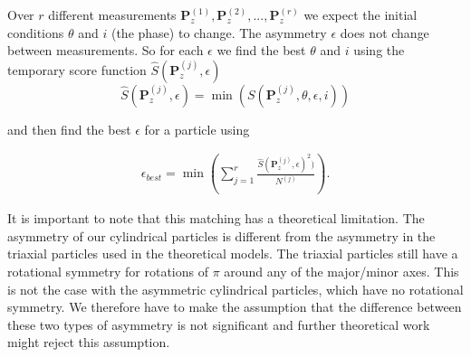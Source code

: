 \noindent Over $r$ different measurements $\mathbf{P}_z^{(1)}, \mathbf{P}_z^{(2)}, ..., \mathbf{P}_z^{(r)}$ we expect  the initial conditions $\theta$ and $i$ (the phase) to change. The asymmetry $\epsilon$ does not change between measurements. So for each $\epsilon$ we find the best $\theta$ and $i$ using the temporary score function $\hat{S}(\mathbf{P}^{(j)}_z, \epsilon)$ 
\begin{equation}
\hat{S}(\mathbf{P}^{(j)}_z, \epsilon) =  \min(S(\mathbf{P}^{(j)}_z, \theta, \epsilon, i)) 
\end{equation}

\noindent and  then find the best $\epsilon$ for a particle using

\begin{eqnarray}
\epsilon_{best} = \min \left(\sum\limits_{j=1}^{r} \frac{\hat{S}(\mathbf{P}^{(j)}_z, \epsilon)^2)}{N^{(j)}} \right).	
\end{eqnarray}


It is important to note that this matching has a theoretical limitation. The asymmetry of our cylindrical particles is different from the asymmetry in the triaxial particles used in the theoretical models. The triaxial particles still have a rotational symmetry for rotations of $\pi$ around any of the major/minor axes. This is not the case with the asymmetric cylindrical particles, which have no rotational symmetry. We therefore have to make the assumption that the difference between these two types of asymmetry is not significant and further theoretical work might reject this assumption.

